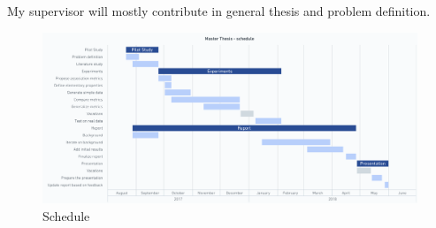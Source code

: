 \documentclass{kththesis}
\begin{document}
My supervisor will mostly contribute in general thesis and problem definition.

\begin{figure}[ht]
	\centering
  \includegraphics[width=0.95\textheight, angle=90]{gantt.png}
	\caption{Schedule}
	\label{fig}
\end{figure}

\clearpage

\printbibliography[heading=bibintoc]

\end{document}
